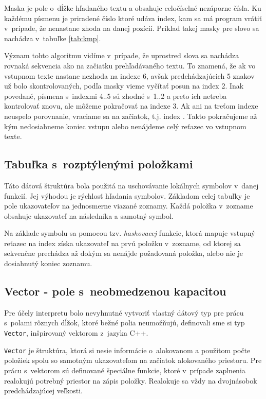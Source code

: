 \documentclass[12pt,a4paper,titlepage,final]{article}
\begin{document}
Maska je pole o~dĺžke hľadaného textu a obsahuje celočíselné nezáporne čísla.
Ku každému písmenu je priradené číslo ktoré udáva index, kam sa má program
 vrátiť v~prípade, že nenastane zhoda na danej pozícií. Príklad takej masky
 pre slovo  sa nachádza v~tabuľke \ref{tab:kmp}.

Význam tohto algoritmu vidíme v~prípade, že uprostred slova sa nachádza
 rovnaká sekvencia ako na začiatku prehľadávaného textu.
To znamená, že ak vo vstupnom texte nastane nezhoda na indexe 6, avšak
 predchádzajúcich 5 znakov už bolo skontrolovaných, podľa masky vieme vyčítať
 posun na index 2. Inak povedané, písmena s~indexmi 4..5 sú zhodné s~1..2
 a preto ich netreba kontrolovať znovu, ale môžeme pokračovať na indexe 3.
Ak ani na treťom indexe neuspelo porovnanie, vraciame sa na začiatok, t.j.
index . Takto pokračujeme až kým nedosiahneme koniec vstupu alebo
nenájdeme celý reťazec vo vstupnom texte.

\subsection{Tabuľka s~rozptýlenými položkami}
Táto dátová štruktúra bola použitá na uschovávanie lokálnych symbolov v~danej
 funkcií. Jej výhodou je rýchlosť hľadania symbolov. 
Základom celej tabuľky je pole ukazovateľov na jednosmerne viazané zoznamy.
Každá položka v~zozname obsahuje ukazovateľ na následníka a samotný symbol.

Na základe symbolu sa pomocou tzv. \emph{hashovacej} funkcie, 
 ktorá mapuje vstupný reťazec na index získa ukazovateľ na prvú položku
 v~zozname, od ktorej sa sekvenčne prechádza až dokým sa nenájde požadovaná
 položka, alebo nie je dosiahnutý koniec zoznamu.
 
\subsection{Vector - pole s~neobmedzenou kapacitou}\label{vektor}
Pre účely interpretu bolo nevyhnutné vytvoriť vlastný dátový typ pre prácu
s~polami rôznych dĺžok, ktoré bežné polia neumožňujú, definovali sme si
typ \texttt{Vector}, inšpirovaný vektorom z~jazyka C++. 

\texttt{Vector} je štruktúra, ktorá si nesie informácie o~alokovanom a použitom 
počte položiek spolu so samotným ukazovateľom na začiatok alokovaného priestoru. 
Pre prácu s~vektorom sú definované špeciálne funkcie, ktoré v~prípade zaplnenia
realokujú potrebný priestor na zápis položky. Realokuje sa vždy na dvojnásobok
predchádzajúcej veľkosti.
\end{document}
